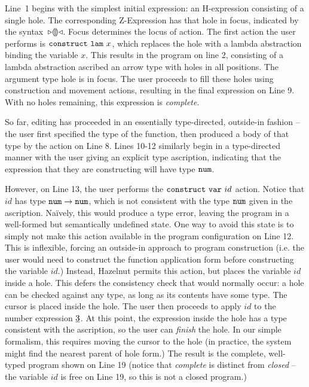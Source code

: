 \documentclass{llncs}
\begin{document}
Line~1 begins with the simplest initial expression: an H-expression
consisting of a single hole. The corresponding Z-Expression has that hole in focus,
indicated by the syntax~${\triangleright}{\llparenthesis\rrparenthesis}{\triangleleft}$. Focus determines the locus of action. The first action the user performs is $\mathtt{construct}~\mathtt{lam}~x$, which replaces the hole with a lambda abstraction binding the variable $x$. This results in the program on line
2, consisting of a lambda abstraction ascribed an arrow type with holes in all positions. The argument type hole is in focus. The
user proceeds to fill these holes using construction and movement actions, resulting in the final expression on Line 9. With no holes remaining, this expression is \emph{complete}.%

So far, editing has proceeded in an essentially type-directed, outside-in fashion -- the user first specified the type of the function, then produced a body of that type by the action on Line 8. Lines 10-12 similarly begin in a type-directed manner with the user giving an explicit type ascription, indicating that the expression that they are constructing will have type $\texttt{num}$. 

However, on Line 13, the user performs the $\mathtt{construct}~\mathtt{var}~id$ action. Notice that $id$ has type $\texttt{num} \rightarrow \texttt{num}$, which is not consistent with the type $\texttt{num}$ given in the ascription. Na\"ively, this would produce a type error, leaving the program in a well-formed but semantically undefined state. One way to avoid this state is to simply not make this action available in the program configuration on Line 12. This is inflexible, forcing an outside-in approach to program construction (i.e. the user would need to construct the function application form before constructing the variable $id$.) Instead, Hazelnut permits this action, but places the variable $id$ inside a hole. This defers the consistency check that would normally occur: a hole can be checked against any type, as long as its contents have some type. The cursor is placed inside the hole. The user then proceeds to apply $id$ to the number expression $\underline{3}$. At this point, the expression inside the hole has a type consistent with the ascription, so the user can \emph{finish} the hole. In our simple formalism, this requires moving the cursor to the hole (in practice, the system might find the nearest parent of hole form.) The result is the complete, well-typed program shown on Line 19 (notice that \emph{complete} is distinct from \emph{closed} -- the variable $id$ is free on Line 19, so this is not a closed program.)
\end{document}
